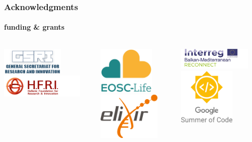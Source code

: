 \documentclass{beamer}
\begin{document}
   \begin{frame}
      \frametitle{Acknowledgments}
      \framesubtitle{funding \& grants}

      \begin{columns}[onlytextwidth]

            \includegraphics[width=30mm]{resources/thumbnail_gsri_logo_v2-en.png}
            \includegraphics[width=40mm]{resources/elidek_logo_en.png}
   
            \includegraphics[width=27mm]{resources/eosclogo.png}
            \includegraphics[width=30mm]{resources/Elixir-Europe-logo-1.png}

            \includegraphics[width=35mm]{resources/Acronym_Environment_RECONNECT_transp.png}
            \includegraphics[width=27mm]{resources/GSoC_logo.svg.png}

      \end{columns}

   \end{frame}
\end{document}
